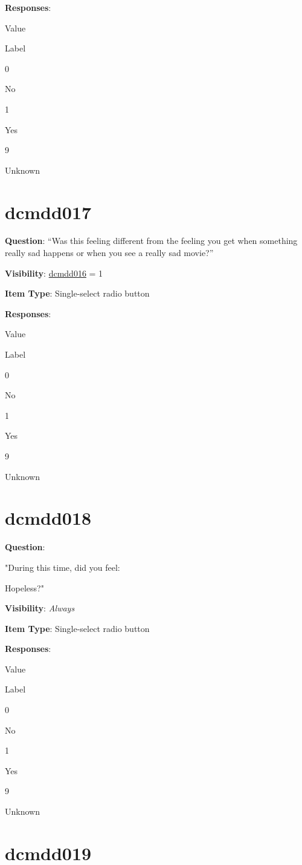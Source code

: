 \documentclass[
]{book}
\begin{document}
\textbf{Responses}:

Value

Label

0

No

1

Yes

9

Unknown

\hypertarget{dcmdd017}{%
\section{dcmdd017}\label{dcmdd017}}

\textbf{Question}: ``Was this feeling different from the feeling you get when something really sad happens or when you see a really sad movie?''

\textbf{Visibility}: \protect\hyperlink{dcmdd016}{dcmdd016} = 1

\textbf{Item Type}: Single-select radio button

\textbf{Responses}:

Value

Label

0

No

1

Yes

9

Unknown

\hypertarget{dcmdd018}{%
\section{dcmdd018}\label{dcmdd018}}

\textbf{Question}:

"During this time, did you feel:

Hopeless?"

\textbf{Visibility}: \emph{Always}

\textbf{Item Type}: Single-select radio button

\textbf{Responses}:

Value

Label

0

No

1

Yes

9

Unknown

\hypertarget{dcmdd019}{%
\section{dcmdd019}\label{dcmdd019}}
\end{document}

